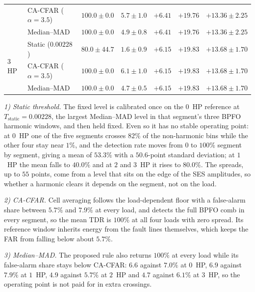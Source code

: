 \begin{table}[!t]
\begin{tabular}{llccccc}
 & CA-CFAR ($\alpha=3.5$) & $100.0 \pm 0.0$ & $5.7 \pm 1.0$ & $+6.41$ & $+19.76$ & $+13.36 \pm 2.25$ \\
 & Median--MAD           & $100.0 \pm 0.0$ & $4.9 \pm 0.8$ & $+6.41$ & $+19.76$ & $+13.36 \pm 2.25$ \\
\midrule
\multirow{3}{*}{3 HP}
 & Static ($0.00228$)   & $80.0 \pm 44.7$ & $1.6 \pm 0.9$ & $+6.15$ & $+19.83$ & $+13.68 \pm 1.70$ \\
 & CA-CFAR ($\alpha=3.5$) & $100.0 \pm 0.0$ & $6.1 \pm 1.0$ & $+6.15$ & $+19.83$ & $+13.68 \pm 1.70$ \\
 & Median--MAD           & $100.0 \pm 0.0$ & $4.7 \pm 0.5$ & $+6.15$ & $+19.83$ & $+13.68 \pm 1.70$ \\
\bottomrule
\end{tabular}
\end{table}

\emph{1) Static threshold.} The fixed level is calibrated once on the $0$~HP
reference at $T_{\text{static}}=0.00228$, the largest Median--MAD level in that
segment's three BPFO harmonic windows, and then held fixed. Even so it has no
stable operating point: at $0$~HP one of the five segments crosses $82\%$ of the
non-harmonic bins while the other four stay near $1\%$, and the detection rate
moves from $0$ to $100\%$ segment by segment, giving a mean of $53.3\%$ with a
$50.6$-point standard deviation; at $1$~HP the mean falls to $40.0\%$ and at
$2$ and $3$~HP it rises to $80.0\%$. The spreads, up to $55$ points, come from a
level that sits on the edge of the SES amplitudes, so whether a harmonic clears
it depends on the segment, not on the load.

\emph{2) CA-CFAR.} Cell averaging follows the load-dependent floor with a
false-alarm share between $5.7\%$ and $7.9\%$ at every load, and detects the
full BPFO comb in every segment, so the mean TDR is $100\%$ at all four loads
with zero spread. Its reference window inherits energy from the fault lines
themselves, which keeps the FAR from falling below about $5.7\%$.

\emph{3) Median--MAD.} The proposed rule also returns $100\%$ at every load
while its false-alarm share stays below CA-CFAR: $6.6$ against $7.0\%$ at
$0$~HP, $6.9$ against $7.9\%$ at $1$~HP, $4.9$ against $5.7\%$ at $2$~HP and
$4.7$ against $6.1\%$ at $3$~HP, so the operating point is not paid for in
extra crossings.

